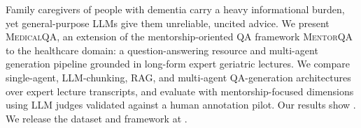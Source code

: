Family caregivers of people with dementia carry a heavy informational
burden, yet general-purpose LLMs give them unreliable, uncited advice.
We present \textsc{MedicalQA}, an extension of the mentorship-oriented QA
framework \textsc{MentorQA} to the healthcare domain: a question-answering
resource and multi-agent generation pipeline grounded in long-form expert
geriatric lectures. 
We compare single-agent, LLM-chunking, RAG, and multi-agent QA-generation
architectures over expert lecture transcripts, and evaluate with
mentorship-focused dimensions using LLM judges validated against a human
annotation pilot.  Our results show . We release the
dataset and framework at .
